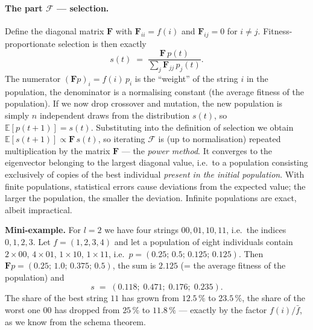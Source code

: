 \documentclass[11pt,a4paper]{article}
\theoremstyle{definition}
\providecommand{\uv}[1]{``#1''}
\begin{document}
\paragraph{The part $\mathcal{F}$ --- selection.} Define the diagonal matrix
$\mathbf{F}$ with $\mathbf{F}_{ii} = f(i)$ and $\mathbf{F}_{ij} = 0$ for
$i \ne j$. Fitness-proportionate selection is then exactly
\[
s(t) \;=\; \frac{\mathbf{F}\,p(t)}{\sum_j \mathbf{F}_{jj}\,p_j(t)} .
\]
The numerator $(\mathbf{F}p)_i = f(i)\,p_i$ is the \uv{weight} of the string $i$
in the population, the denominator is a normalising constant (the average
fitness of the population). If we now drop crossover and mutation, the new
population is simply $n$ independent draws from the distribution $s(t)$, so
$\mathbb{E}[p(t+1)] = s(t)$. Substituting into the definition of selection we
obtain $\mathbb{E}[s(t+1)] \propto \mathbf{F}\,s(t)$, so iterating $\mathcal{F}$
is (up to normalisation) repeated multiplication by the matrix $\mathbf{F}$ ---
the \emph{power method}. It converges to the eigenvector belonging to the
largest diagonal value, i.e.\ to a population consisting exclusively of copies
of the best individual \emph{present in the initial population}. With finite
populations, statistical errors cause deviations from the expected value; the
larger the population, the smaller the deviation. Infinite populations are
exact, albeit impractical.

\textbf{Mini-example.} For $l = 2$ we have four strings $00,01,10,11$, i.e.\ the
indices $0,1,2,3$. Let $f = (1, 2, 3, 4)$ and let a population of eight
individuals contain $2\times 00$, $4\times 01$, $1\times 10$, $1\times 11$,
i.e.\ $p = (0.25;\,0.5;\,0.125;\,0.125)$. Then
$\mathbf{F}p = (0.25;\,1.0;\,0.375;\,0.5)$, the sum is $2.125$
(= the average fitness of the population) and
\[
s \;=\; (0.118;\; 0.471;\; 0.176;\; 0.235).
\]
The share of the best string $11$ has grown from $12.5\,\%$ to $23.5\,\%$, the
share of the worst one $00$ has dropped from $25\,\%$ to $11.8\,\%$ --- exactly
by the factor $f(i)/\bar f$, as we know from the schema theorem.
\end{document}
